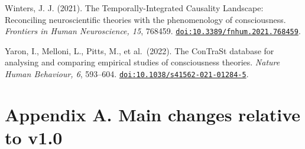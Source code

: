 \documentclass[
  11pt,
  a4paper,
]{article}
\begin{document}
Winters, J. J. (2021). The Temporally-Integrated Causality Landscape:
Reconciling neuroscientific theories with the phenomenology of
consciousness. \emph{Frontiers in Human Neuroscience, 15}, 768459.
\href{https://doi.org/10.3389/fnhum.2021.768459}{\nolinkurl{doi:10.3389/fnhum.2021.768459}}.

Yaron, I., Melloni, L., Pitts, M., et al.~(2022). The ConTraSt database
for analysing and comparing empirical studies of consciousness theories.
\emph{Nature Human Behaviour, 6}, 593--604.
\href{https://doi.org/10.1038/s41562-021-01284-5}{\nolinkurl{doi:10.1038/s41562-021-01284-5}}.

\hypertarget{appendix-a.-main-changes-relative-to-v1.0}{%
\clearpage
\section{Appendix A. Main changes relative to
v1.0}\label{appendix-a.-main-changes-relative-to-v1.0}}
\end{document}
